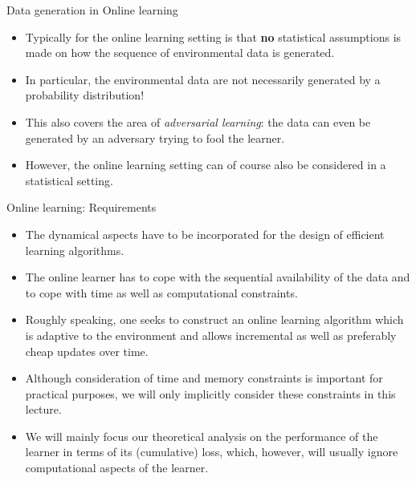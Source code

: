 \documentclass[11pt,compress,t,notes=noshow, xcolor=table]{beamer}
\begin{document}
\begin{frame}{Data generation in Online learning}
%	
	\begin{itemize}
%		
		\item Typically for the online learning setting is that \textbf{no} statistical assumptions is made on how the sequence of environmental data is generated.
%		
		\item In particular, the environmental data are not necessarily generated by a probability distribution!
%		
		\item This also covers the area of \emph{adversarial learning}: the data can even be generated by an adversary trying to fool the learner.
%		
		\item However, the online learning setting can of course also be considered in a statistical setting.
%		
	\end{itemize}
%	
\end{frame}


\begin{frame}{Online learning: Requirements}
	\small
	\begin{itemize}
		\item The dynamical aspects have to be incorporated for the design of efficient learning algorithms. 
		 \item The online learner has to cope with the sequential availability of the data and to cope with time as well as computational constraints.
		 \item Roughly speaking, one seeks to construct an online learning algorithm which is adaptive to the environment and allows incremental as well as preferably cheap updates over time.
		 \item Although consideration of time and memory constraints is important for practical purposes, we will only implicitly consider these constraints in this lecture. 
		 \item We will mainly focus our theoretical analysis on the performance of the learner in terms of its (cumulative) loss, which, however, will usually ignore computational aspects of the learner.
	\end{itemize}
\end{frame}
\end{document}

